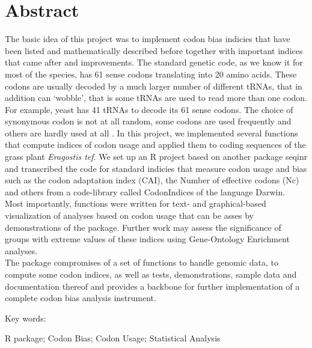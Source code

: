 

\cleardoublepage
\chapter*{Abstract}

The basic idea of this project was to implement codon bias indicies that have been listed and mathematically described before \cite{BinderCh13} together with important indices that came after and improvements. 
The standard genetic code, as we know it for most of the species, has 61 sense codons translating into 20 amino acids. These codons are usually decoded by a much larger number of different tRNAs, that in addition can ‘wobble’, that is some tRNAs are used to read more than one codon. For example, yeast has 41 tRNAs to decode its 61 sense codons. The choice of synonymous codon is not at all random, some codons are used frequently and others are hardly used at all \cite{Cannarozzi2010}. In this project, we implemented several functions that compute indices of codon usage and applied them to coding sequences of the grass plant \textit{Eragostis tef}. We set up an R project based on another package seqinr and transcribed the code for standard indicies that measure codon usage and bias such as the codon adaptation index (CAI), the Number of effective codons (Nc) and others from a code-library called CodonIndices of the language Darwin.\\
Most importantly, functions were written for text- and graphical-based visualization of analyses based on codon usage that can be asses by demonstrations of the package. Further work may assess the significance of groups with extreme values of these indices using Gene-Ontology Enrichment analyses.\\
The package compromises of a set of functions to handle genomic data, to compute some codon indices, as well as tests, demonstrations, sample data and documentation thereof and provides a backbone for further implementation of a complete codon bias analysis instrument.


\vskip0.5cm
Key words: 

R package; Codon Bias; Codon Usage; Statistical Analysis



\cleardoublepage

